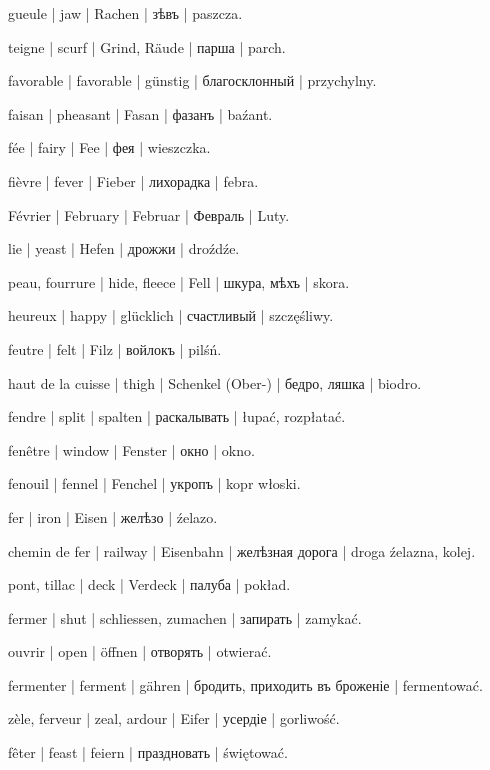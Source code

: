 \begin{outdent}{1em}
gueule | jaw | Rachen | зѣвъ | paszcza.

teigne | scurf | Grind, Räude | парша | parch.

favorable | favorable | günstig | благосклонный | przychylny.

faisan | pheasant | Fasan | фазанъ | baźant.

fée | fairy | Fee | фея | wieszczka.

fièvre | fever | Fieber | лихорадка | febra.

Février | February | Februar | Февраль | Luty.

lie | yeast | Hefen | дрожжи | droźdźe.

peau, fourrure | hide, fleece | Fell | шкура, мѣхъ | skora.

heureux | happy | glücklich | счастливый | szczęśliwy.

feutre | felt | Filz | войлокъ | pilśń.

haut de la cuisse | thigh | Schenkel (Ober-) | бедро, ляшка | biodro.

fendre | split | spalten | раскалывать | łupać, rozpłatać.

fenêtre | window | Fenster | окно | okno.

fenouil | fennel | Fenchel | укропъ | kopr włoski.

fer | iron | Eisen | желѣзо | źelazo.

\uvsubentry{}
chemin de fer | railway | Eisenbahn | желѣзная дорога | droga źelazna, kolej.

pont, tillac | deck | Verdeck | палуба | pokład.

fermer | shut | schliessen, zumachen | запирать | zamykać.

\uvsubentry{}
ouvrir | open | öffnen | отворять | otwierać.

fermenter | ferment | gähren | бродить, приходить въ
броженіе | fermentować.

zèle, ferveur | zeal, ardour | Eifer | усердіе | gorliwość.

fêter | feast | feiern | праздновать | świętować.


\end{outdent}
